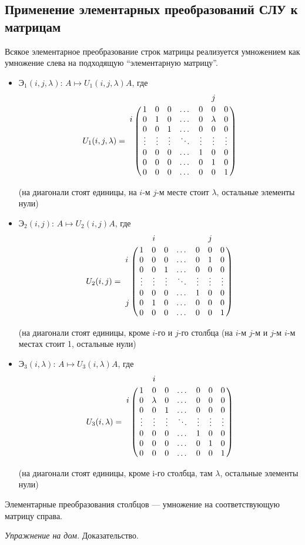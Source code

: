 \subsection{Применение элементарных преобразований СЛУ к матрицам}

Всякое элементарное преобразование строк матрицы реализуется умножением как умножение слева на подходящую ``элементарную матрицу''.

\begin{itemize}
\item 
    $\text{Э}_1(i, j, \lambda)$: $A \mapsto U_1(i, j, \lambda)A$, где
    \begin{equation*}
        U_1(i, j, \lambda) = \bordermatrix{
            &   &   &   &   &   & j &   \cr
            & 1 & 0 & 0 & \dots & 0 & 0 & 0 \cr
          i & 0 & 1 & 0 & \dots & 0 & \lambda & 0 \cr
            & 0 & 0 & 1 & \dots & 0 & 0 & 0 \cr
            & \vdots & \vdots & \vdots & \ddots & \vdots & \vdots & \vdots \cr
            & 0 & 0 & 0 & \dots & 1 & 0 & 0 \cr
            & 0 & 0 & 0 & \dots & 0 & 1 & 0 \cr
            & 0 & 0 & 0 & \dots & 0 & 0 & 1
        }
    \end{equation*}

    (на диагонали стоят единицы, на $i$-м $j$-м месте стоит $\lambda$, остальные элементы нули)

\item

    $\text{Э}_2(i, j)$: $A \mapsto U_2(i, j)A$, где
    \begin{equation*}
        U_2(i, j) = \bordermatrix{
            &   & i &   &   &   & j &   \cr
            & 1 & 0 & 0 & \dots & 0 & 0 & 0 \cr
          i & 0 & 0 & 0 & \dots & 0 & 1 & 0 \cr
            & 0 & 0 & 1 & \dots & 0 & 0 & 0 \cr
            & \vdots & \vdots & \vdots & \ddots & \vdots & \vdots & \vdots \cr
            & 0 & 0 & 0 & \dots & 1 & 0 & 0 \cr
          j & 0 & 1 & 0 & \dots & 0 & 0 & 0 \cr
            & 0 & 0 & 0 & \dots & 0 & 0 & 1
        }
    \end{equation*}

    (на диагонали стоят единицы, кроме $i$-го и $j$-го столбца (на $i$-м $j$-м и $j$-м $i$-м местах стоит 1, остальные нули)

\item 
    $\text{Э}_3(i, \lambda)$: $A \mapsto U_3(i, \lambda)A$, где
    \begin{equation*}
        U_3(i, \lambda) = \bordermatrix{    
            &   & i &   &   &   &   &   \cr
            & 1 & 0 & 0 & \dots & 0 & 0 & 0 \cr
          i & 0 & \lambda & 0 & \dots & 0 & 0 & 0 \cr
            & 0 & 0 & 1 & \dots & 0 & 0 & 0 \cr
            & \vdots & \vdots & \vdots & \ddots & \vdots & \vdots & \vdots \cr
            & 0 & 0 & 0 & \dots & 1 & 0 & 0 \cr
            & 0 & 0 & 0 & \dots & 0 & 1 & 0 \cr
            & 0 & 0 & 0 & \dots & 0 & 0 & 1
        }
    \end{equation*}

    (на диагонали стоят единицы, кроме i-го столбца, там $\lambda$, остальные элементы нули)
\end{itemize}

Элементарные преобразования столбцов --- умножение на соответствующую матрицу справа.

\textit{Упражнение на дом.} Доказательство.
